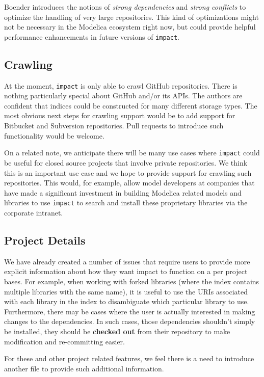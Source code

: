 \documentclass[11pt,a4paper,twocolumn]{article}
\newcommand{\code}[1]{\texttt{#1}} %
\begin{document}
Boender introduces the notions of \emph{strong dependencies} and
\emph{strong conflicts} to optimize the handling of very large
repositories.  This kind of optimizations might not be necessary in
the Modelica ecosystem right now, but could provide helpful
performance enhancements in future versions of \code{impact}.

\subsection{Crawling}

At the moment, \code{impact} is only able to crawl GitHub
repositories.  There is nothing particularly special about GitHub
and/or its APIs.  The authors are confident that indices could be
constructed for many different storage types.  The most obvious next
steps for crawling support would be to add support for Bitbucket and
Subversion repositories.  Pull requests to introduce such
functionality would be welcome.

On a related note, we anticipate there will be many use cases where
\code{impact} could be useful for closed source projects that involve
private repositories.  We think this is an important use case and we
hope to provide support for crawling such repositories.  This would,
for example, allow model developers at companies that have made a
significant investment in building Modelica related models and
libraries to use \code{impact} to search and install these proprietary
libraries via the corporate intranet.

\subsection{Project Details}

We have already created a number of issues that require users to
provide more explicit information about how they want impact to
function on a per project bases.  For example, when working with
forked libraries (where the index contains multiple libraries with the
same name), it is useful to use the URIs associated with each library
in the index to disambiguate which particular library to use.
Furthermore, there may be cases where the user is actually interested
in making changes to the dependencies.  In such cases, those
dependencies shouldn't simply be installed, they should be {\bf
  checked out} from their repository to make modification and
re-committing easier.

For these and other project related features, we feel there is a need
to introduce another file to provide such additional information.
\end{document}

